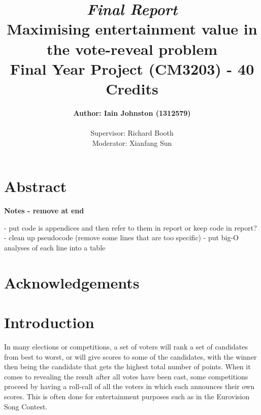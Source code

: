 \documentclass[12pt]{report}
\title{\textit{Final Report}\\\textbf{Maximising entertainment value in the vote-reveal problem}\\ Final Year Project (CM3203) - 40 Credits}
\author{\textbf{Author: Iain Johnston (1312579)} \\ \\ Supervisor: Richard Booth\\ Moderator: Xianfang Sun}
\date{} %
\begin{document}
\maketitle
\clearpage

\section*{Abstract}
\textbf{Notes - remove at end}

- put code is appendices and then refer to them in report or keep code in report?
- clean up pseudocode (remove some lines that are too specific)
- put big-O analyses of each line into a table


\section*{Acknowledgements}

\tableofcontents %
\listoffigures
\listoftables
\clearpage %

\section{Introduction}\label{Introduction}
In many elections or competitions, a set of voters will rank a set of candidates from best to worst, or will give scores to some of the candidates, with the winner then being the candidate that gets the highest total number of points. When it comes to revealing the result after all votes have been cast, some competitions proceed by having a roll-call of all the voters in which each announces their own scores. This is often done for entertainment purposes such as in the Eurovision Song Contest.\cite{EurovisionVoting}
\end{document}
